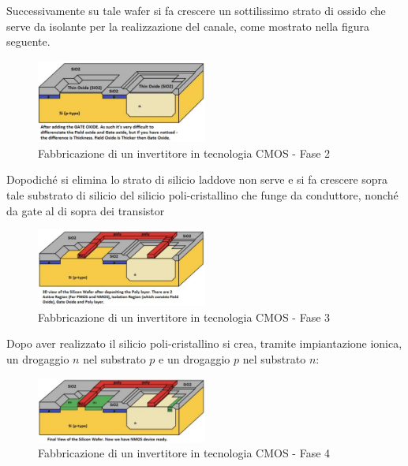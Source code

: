 \documentclass[a4paper]{extarticle}
\begin{document}
\noindent
Successivamente su tale wafer si fa crescere un sottilissimo strato di ossido che serve da isolante per la realizzazione del canale, come mostrato nella figura seguente.

\begin{figure}[H]
    \centering
    \includegraphics[width=0.5\textwidth]{fabbricazione-invertitore-cmos-2.png}
    \caption{Fabbricazione di un invertitore in tecnologia CMOS - Fase 2}
    \label{fig:fabbricazione_invertitore_cmos_2}
\end{figure}

\noindent
Dopodiché si elimina lo strato di silicio laddove non serve e si fa crescere sopra tale substrato di silicio del silicio poli-cristallino che funge da conduttore, nonché da gate al di sopra dei transistor

\begin{figure}[H]
    \centering
    \includegraphics[width=0.5\textwidth]{fabbricazione-invertitore-cmos-3.png}
    \caption{Fabbricazione di un invertitore in tecnologia CMOS - Fase 3}
    \label{fig:fabbricazione_invertitore_cmos_3}
\end{figure}

\noindent
Dopo aver realizzato il silicio poli-cristallino si crea, tramite impiantazione ionica, un drogaggio $n$ nel substrato $p$ e un drogaggio $p$ nel substrato $n$:

\begin{figure}[H]
    \centering
    \includegraphics[width=0.5\textwidth]{fabbricazione-invertitore-cmos-4.png}
    \caption{Fabbricazione di un invertitore in tecnologia CMOS - Fase 4}
    \label{fig:fabbricazione_invertitore_cmos_4}
\end{figure}
\end{document}
